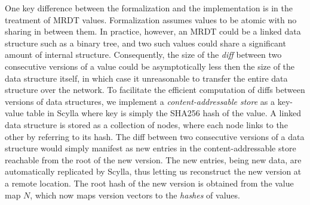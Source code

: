 One key difference between the formalization and the implementation is
in the treatment of MRDT values. Formalization assumes values to be
atomic with no sharing in between them. In practice, however, an MRDT
could be a linked data structure such as a binary tree, and two
such values could share a significant amount of internal structure.
Consequently, the size of the \emph{diff} between two consecutive
versions of a value could be asymptotically less then the size of the
data structure itself, in which case it unreasonable to transfer the
entire data structure over the network. To facilitate the efficient
computation of diffs between versions of data structures, we implement
a \emph{content-addressable store} as a key-value table in Scylla
where key is simply the SHA256 hash of the value. A linked data
structure is stored as a collection of nodes, where each node links to
the other by referring to its hash. The diff between two consecutive
versions of a data structure would simply manifest as new entries in
the content-addressable store reachable from the root of the new
version. The new entries, being new data, are automatically replicated
by Scylla, thus letting us reconstruct the new version at a remote
location. The root hash of the new version is obtained from the value
map $N$, which now maps version vectors to the \emph{hashes} of
values.
